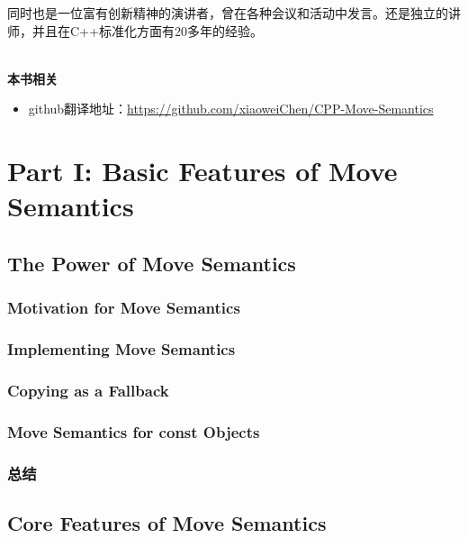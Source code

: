 \documentclass[11pt,a4paper,UTF8]{ctexart}
\begin{document}
	同时也是一位富有创新精神的演讲者，曾在各种会议和活动中发言。还是独立的讲师，并且在C++标准化方面有20多年的经验。\par
	
	\hspace*{\fill} \\ %
	\noindent\textbf{本书相关}\ \par
	\begin{itemize}
		\item github翻译地址：\href{https://github.com/xiaoweiChen/CPP-Move-Semantics}{https://github.com/xiaoweiChen/CPP-Move-Semantics}
	\end{itemize}
	\newpage
	
	\tableofcontents
	\newpage
	
	\pagestyle{empty}

	\section{Part I: Basic Features of Move Semantics}
	\subsection{The Power of Move Semantics}
		\subsubsection{Motivation for Move Semantics}
		\subsubsection{Implementing Move Semantics}
		\subsubsection{Copying as a Fallback}
		\subsubsection{Move Semantics for const Objects}
		\subsubsection{总结}
	\subsection{Core Features of Move Semantics}
\end{document}
